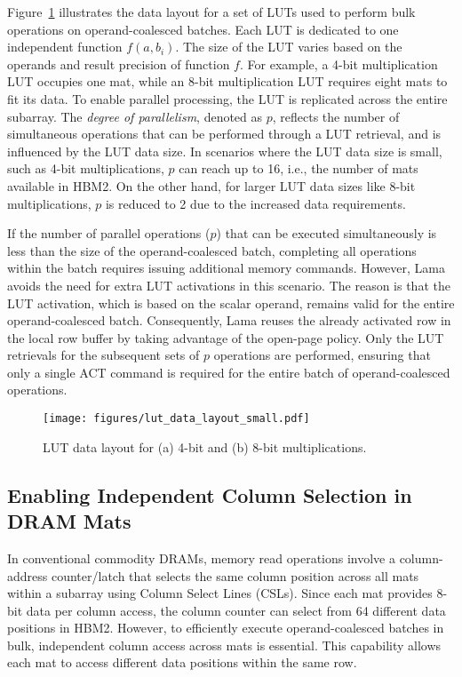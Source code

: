 Figure~\ref{fig:lut_data_layout} illustrates the data layout for a set of LUTs used to perform bulk operations on operand-coalesced batches. Each LUT is dedicated to one independent function $f(a,b_{i})$. The size of the LUT varies based on the operands and result precision of function $f$. For example, a 4-bit multiplication LUT occupies one mat, while an 8-bit multiplication LUT requires eight mats to fit its data. To enable parallel processing, the LUT is replicated across the entire subarray. The \textit{degree of parallelism}, denoted as $p$, reflects the number of simultaneous operations that can be performed through a LUT retrieval, and is influenced by the LUT data size. In scenarios where the LUT data size is small, such as 4-bit multiplications, $p$ can reach up to 16, i.e., the number of mats available in HBM2. On the other hand, for larger LUT data sizes like 8-bit multiplications, $p$ is reduced to 2 due to the increased data requirements.

If the number of parallel operations ($p$) that can be executed simultaneously is less than the size of the operand-coalesced batch, completing all operations within the batch requires issuing additional memory commands. However, Lama avoids the need for extra LUT activations in this scenario. The reason is that the LUT activation, which is based on the scalar operand, remains valid for the entire operand-coalesced batch. Consequently, Lama reuses the already activated row in the local row buffer by taking advantage of the open-page policy. Only the LUT retrievals for the subsequent sets of $p$ operations are performed, ensuring that only a single ACT command is required for the entire batch of operand-coalesced operations.

\begin{figure}[t!]
\centering
\texttt{[image: figures/lut\_data\_layout\_small.pdf]}
\caption{LUT data layout for (a) 4-bit and (b) 8-bit multiplications.}
\label{fig:lut_data_layout}
\vskip -0.15in
\end{figure}

\subsection{Enabling Independent Column Selection in DRAM Mats}
In conventional commodity DRAMs, memory read operations involve a column-address counter/latch that selects the same column position across all mats within a subarray using Column Select Lines (CSLs). Since each mat provides 8-bit data per column access, the column counter can select from 64 different data positions in HBM2. However, to efficiently execute operand-coalesced batches in bulk, independent column access across mats is essential. This capability allows each mat to access different data positions within the same row.


